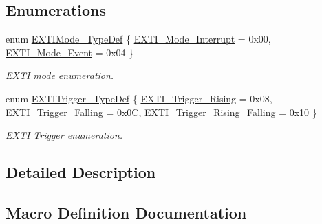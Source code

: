 \subsection*{Enumerations}
\begin{DoxyCompactItemize}
\item 
enum \mbox{\hyperlink{group___e_x_t_i___exported___types_gad5e69af98dc0dfdf64417adc1cf57929}{E\+X\+T\+I\+Mode\+\_\+\+Type\+Def}} \{ \mbox{\hyperlink{group___e_x_t_i___exported___types_ggad5e69af98dc0dfdf64417adc1cf57929a8c6ccdd7b1bc4872731306537e8c3b42}{E\+X\+T\+I\+\_\+\+Mode\+\_\+\+Interrupt}} = 0x00, 
\mbox{\hyperlink{group___e_x_t_i___exported___types_ggad5e69af98dc0dfdf64417adc1cf57929aa38ef186929ec74786df79877ea124a7}{E\+X\+T\+I\+\_\+\+Mode\+\_\+\+Event}} = 0x04
 \}
\begin{DoxyCompactList}\small\item\em E\+X\+TI mode enumeration. \end{DoxyCompactList}\item 
enum \mbox{\hyperlink{group___e_x_t_i___exported___types_ga9da190f5425d1b421a06bced8cc48e9b}{E\+X\+T\+I\+Trigger\+\_\+\+Type\+Def}} \{ \mbox{\hyperlink{group___e_x_t_i___exported___types_gga9da190f5425d1b421a06bced8cc48e9baaa73605adf491dbe97994612e228af5e}{E\+X\+T\+I\+\_\+\+Trigger\+\_\+\+Rising}} = 0x08, 
\mbox{\hyperlink{group___e_x_t_i___exported___types_gga9da190f5425d1b421a06bced8cc48e9bac4a21d397aa4648b8f8cf961f71f3ac5}{E\+X\+T\+I\+\_\+\+Trigger\+\_\+\+Falling}} = 0x0C, 
\mbox{\hyperlink{group___e_x_t_i___exported___types_gga9da190f5425d1b421a06bced8cc48e9bab09db55a2e9118e86d03d69698434ebb}{E\+X\+T\+I\+\_\+\+Trigger\+\_\+\+Rising\+\_\+\+Falling}} = 0x10
 \}
\begin{DoxyCompactList}\small\item\em E\+X\+TI Trigger enumeration. \end{DoxyCompactList}\end{DoxyCompactItemize}


\subsection{Detailed Description}


\subsection{Macro Definition Documentation}
\mbox{\label{group___e_x_t_i___exported___types_ga8429170f3320b90227f9f5b252c1c5eb}} 
